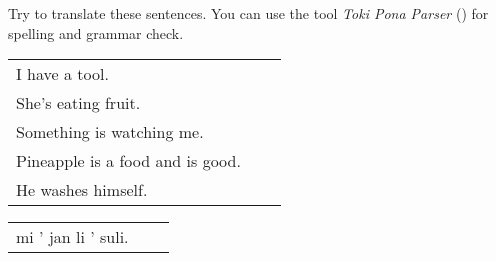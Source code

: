 Try to translate these sentences.
You can use the tool \textit{Toki Pona Parser} (\cite{www:rowa:02}) for spelling and grammar check.

\begin{supertabular}{p{5,5cm}|ll}
    I have a tool.                   &  & \\
    She's eating fruit.              &  & \\
    Something is watching me.        &  & \\
    Pineapple is a food and is good. &  & \\
    He washes himself.               &  & \\ %
\end{supertabular}

\begin{supertabular}{p{5,5cm}|ll}
    mi ' jan li ' suli. &  & \\
\end{supertabular}
